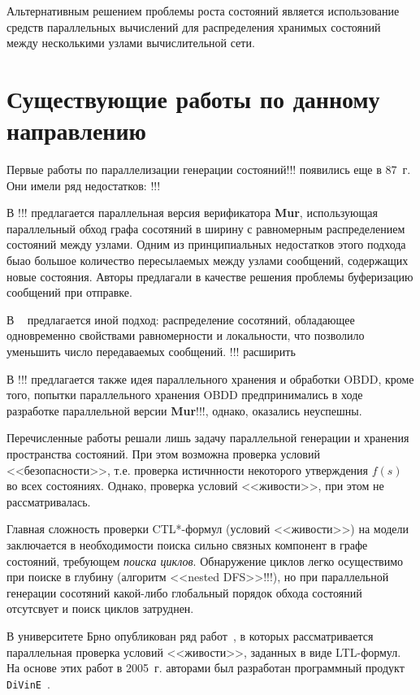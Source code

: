 \documentclass[a4paper,notitlepage,14pt]{article}
\begin{document}
Альтернативным решением проблемы роста состояний является использование средств
параллельных вычислений для распределения хранимых состояний между несколькими узлами
вычислительной сети.

\section{Существующие работы по данному направлению}
\label{sec:other-work}

Первые работы по параллелизации генерации состояний!!! появились еще в 87~г. Они
имели ряд недостатков: !!!

В !!! предлагается параллельная версия верификатора \textbf{Mur\phi}, использующая
параллельный обход графа сосотяний в ширину с равномерным распределением состояний между
узлами. Одним из принципиальных недостатков этого подхода быао большое количество
пересылаемых между узлами сообщений, содержащих новые состояния. Авторы предлагали в
качестве решения проблемы буферизацию сообщений при отправке.

В ~\cite{LS99} предлагается иной подход: распределение сосотяний, обладающее одновременно
свойствами равномерности и локальности, что позволило уменьшить число передаваемых
сообщений.
!!! расширить

В !!! предлагается также идея параллельного хранения и обработки OBDD, кроме того, попытки
параллельного хранения OBDD предпринимались в ходе разработке параллельной версии
\textbf{Mur\phi}!!!, однако, оказались неуспешны.

Перечисленные работы решали лишь задачу параллельной генерации и хранения пространства
состояний. При этом возможна проверка условий <<безопасности>>, т.е. проверка истичнности
некоторого утверждения $f(s)$ во всех состояниях. Однако, проверка условий <<живости>>,
при этом не рассматривалась.

Главная сложность проверки CTL*-формул (условий <<живости>>) на модели заключается в
необходимости поиска сильно связных компонент в графе состояний, требующем \emph{поиска
  циклов}. Обнаружение циклов легко осуществимо при поиске в глубину (алгоритм <<nested
DFS>>!!!), но при параллельной генерации сосотяний какой-либо глобальный порядок обхода
состояний отсутсвует и поиск циклов затруднен.

В университете Брно опубликован ряд работ~\cite{DLTL1,DLTL2}, в которых рассматривается
параллельная проверка условий <<живости>>, заданных в виде LTL-формул. На основе этих
работ в 2005~г. авторами был разработан программный продукт \texttt{DiVinE}~\cite{DiVinE}.
\end{document}
